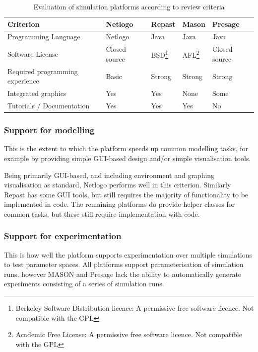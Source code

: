 \begin{table}[!h]
\begin{minipage}{1\textwidth}
	\myfloatalign
	\caption{Evaluation of simulation platforms according to review criteria}\label{tab:platformreview}
	\begin{tabularx}{\textwidth}{X|p{}p{}p{}p{}}
	Criterion & Netlogo & Repast & Mason & Presage \\ \midrule
	Programming Language & Netlogo & Java & Java & Java \\
	Software License & Closed source & BSD\footnote{Berkeley Software Distribution licence: A permissive free software licence. Not compatible with the \ac{GPL}} & AFL\footnote{Academic Free License: A permissive free software licence. Not compatible with the \ac{GPL}} & Closed source \\
	Required programming experience & Basic & Strong & Strong & Strong \\
	Integrated graphics & Yes & Yes & None & Some \\
	Tutorials / Documentation & Yes & Yes & Yes & No \\
	\end{tabularx}
\end{minipage}
\end{table}

\subsubsection*{Support for modelling}

This is the extent to which the platform speeds up common modelling tasks, for example by providing simple \ac{GUI}-based design and/or simple visualisation tools.

Being primarily \ac{GUI}-based, and including environment and graphing visualisation as standard, Netlogo performs well in this criterion. Similarly Repast has some \ac{GUI} tools, but still requires the majority of functionality to be implemented in code. The remaining platforms do provide helper classes for common tasks, but these still require implementation with code.

\subsubsection*{Support for experimentation}

This is how well the platform supports experimentation over multiple simulations to test parameter spaces. All platforms support parameterisation of simulation runs, however MASON and Presage lack the ability to automatically generate experiments consisting of a series of simulation runs.

